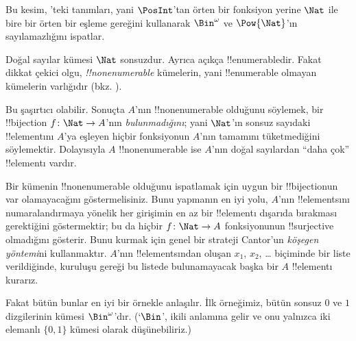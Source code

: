 \documentclass[../../../include/open-logic-section]{subfiles}
\begin{document}


\begin{editorial}
  Bu kesim, 'teki tanımları, yani $\PosInt$'tan örten bir
  fonksiyon yerine $\Nat$ ile bire bir örten bir eşleme gereğini kullanarak
  $\Bin^\omega$ ve $\Pow{\Nat}$'ın sayılamazlığını ispatlar.
\end{editorial}

\begin{explain}
Doğal sayılar kümesi $\Nat$ sonsuzdur. Ayrıca açıkça !!{enumerable}{}dir.
Fakat dikkat çekici olgu, \emph{!!{nonenumerable}} kümelerin, yani
!!{enumerable} olmayan kümelerin varlığıdır
(bkz. ).

Bu şaşırtıcı olabilir. Sonuçta $A$'nın !!{nonenumerable} olduğunu söylemek,
bir !!{bijection} $f\colon\Nat\to A$'nın \emph{bulunmadığını}; yani
$\Nat$'ın sonsuz sayıdaki !!{element}{}ını $A$'ya eşleyen hiçbir fonksiyonun
$A$'nın tamamını tüketmediğini söylemektir. Dolayısıyla $A$
!!{nonenumerable} ise $A$'nın doğal sayılardan ``daha çok'' !!{element}{}ı
vardır.

Bir kümenin !!{nonenumerable} olduğunu ispatlamak için uygun bir
!!{bijection}{}un var olamayacağını göstermelisiniz. Bunu yapmanın en iyi yolu,
$A$'nın !!{element}s{}ını numaralandırmaya yönelik her girişimin en az bir
!!{element}{}ı dışarıda bırakması gerektiğini göstermektir; bu da hiçbir
$f\colon\Nat\to A$ fonksiyonunun !!{surjective} olmadığını gösterir. Bunu
kurmak için genel bir strateji Cantor'un \emph{köşegen yöntemi}ni
kullanmaktır. $A$'nın !!{element}s{}ından oluşan $x_1$, $x_2$, \dots{}
biçiminde bir liste verildiğinde, kuruluşu gereği bu listede bulunamayacak başka bir $A$
!!{element}{}ı kurarız.

Fakat bütün bunlar en iyi bir örnekle anlaşılır. İlk örneğimiz, bütün sonsuz
$0$ ve $1$ dizgilerinin kümesi $\Bin^\omega$'dır. (`$\Bin$', ikili anlamına
gelir ve onu yalnızca iki elemanlı $\{0,1\}$ kümesi olarak düşünebiliriz.)
\end{explain}
\end{document}
